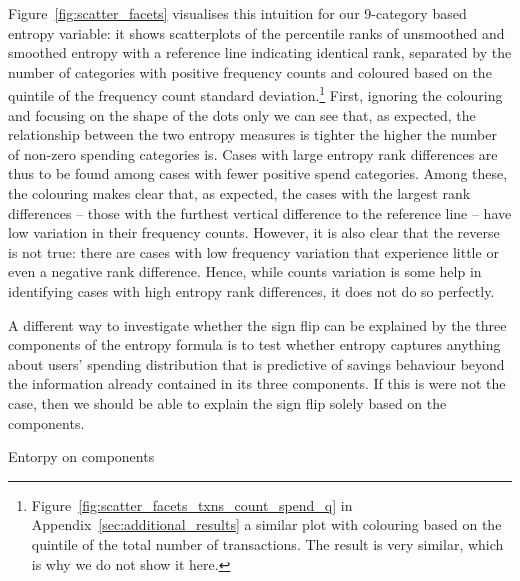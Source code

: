 Figure~\ref{fig:scatter_facets} visualises this intuition for our 9-category
based entropy variable: it shows scatterplots of the percentile ranks of
unsmoothed and smoothed entropy with a reference line indicating identical
rank, separated by the number of categories with positive frequency counts and
coloured based on the quintile of the frequency count standard
deviation.\footnote{Figure~\ref{fig:scatter_facets_txns_count_spend_q} in
    Appendix~\ref{sec:additional_results} a similar plot with colouring based on the
quintile of the total number of transactions. The result is very similar, which
is why we do not show it here.} First, ignoring the colouring and focusing on
the shape of the dots only we can see that, as expected, the relationship
between the two entropy measures is tighter the higher the number of non-zero
spending categories is. Cases with large entropy rank differences are thus to
be found among cases with fewer positive spend categories. Among these, the
colouring makes clear that, as expected, the cases with the largest rank
differences -- those with the furthest vertical difference to the reference
line -- have low variation in their frequency counts. However, it is also clear
that the reverse is not true: there are cases with low frequency variation that
experience little or even a negative rank difference. Hence, while counts
variation is some help in identifying cases with high entropy rank differences,
it does not do so perfectly.

A different way to investigate whether the sign flip can be explained by the
three components of the entropy formula is to test whether entropy captures
anything about users' spending distribution that is predictive of savings
behaviour beyond the information already contained in its three components. If
this is were not the case, then we should be able to explain the sign flip
solely based on the components.

\begin{table}[ht]
\centering\tiny
\caption{Entorpy on components}
\label{tab:entropy_on_components}

\end{table}

